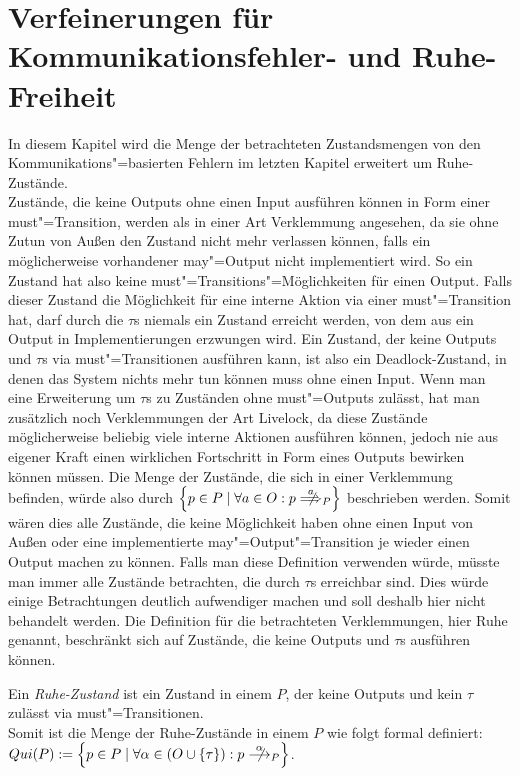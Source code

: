 \chapter{Verfeinerungen für Kommunikationsfehler- und Ruhe-Freiheit}

In diesem Kapitel wird die Menge der betrachteten Zustandsmengen von den
Kommunikations"=basierten Fehlern im letzten Kapitel erweitert um
Ruhe-Zustände.\\
Zustände, die keine Outputs ohne einen Input ausführen können in Form einer
must"=Transition, werden als in einer Art Verklemmung angesehen, da sie ohne
Zutun von Außen den Zustand nicht mehr verlassen können, falls ein möglicherweise
vorhandener may"=Output nicht implementiert wird. So ein Zustand hat also keine
must"=Transitions"=Möglichkeiten für einen Output. Falls dieser Zustand die
Möglichkeit für eine interne Aktion via einer must"=Transition hat, darf durch
die $\tau$s niemals ein Zustand erreicht werden, von dem aus ein Output in
Implementierungen erzwungen wird. Ein Zustand, der keine Outputs und $\tau$s
via must"=Transitionen ausführen kann, ist also ein Deadlock-Zustand, in denen
das System nichts mehr tun können muss ohne einen Input. Wenn man eine
Erweiterung um $\tau$s zu Zuständen ohne must"=Outputs zulässt, hat man
zusätzlich noch Verklemmungen der Art Livelock, da diese Zustände
möglicherweise beliebig viele interne Aktionen ausführen können, jedoch nie aus
eigener Kraft einen wirklichen Fortschritt in Form eines Outputs bewirken
können müssen. Die Menge der Zustände, die sich in einer Verklemmung
befinden, würde also durch $\left\{p\in P\mid \forall a\in O: p\nweakmust[a]_P
\right\}$ beschrieben werden. Somit wären dies alle Zustände, die keine
Möglichkeit haben ohne einen Input von Außen oder eine implementierte
may"=Output"=Transition je wieder einen Output machen zu können. Falls man
diese Definition verwenden würde, müsste man immer alle Zustände betrachten,
die durch $\tau$s erreichbar sind. Dies würde einige Betrachtungen deutlich
aufwendiger machen und soll deshalb hier nicht behandelt werden. Die Definition
für die betrachteten Verklemmungen, hier Ruhe genannt, beschränkt sich auf
Zustände, die keine Outputs und $\tau$s ausführen können.

\begin{Def}[Ruhe]
  Ein \emph{Ruhe-Zustand} ist ein Zustand in einem \MEIO{} $P$, der keine
  Outputs und kein $\tau$ zulässt via must"=Transitionen.\\
  Somit ist die Menge der Ruhe-Zustände in einem \MEIO{} $P$ wie folgt formal
  definiert: $Qui(P):=\left\{p\in P\mid \forall\alpha\in (O\cup\{\tau\}):p
  \nmust[\alpha]_P\right\}$.
\end{Def}

